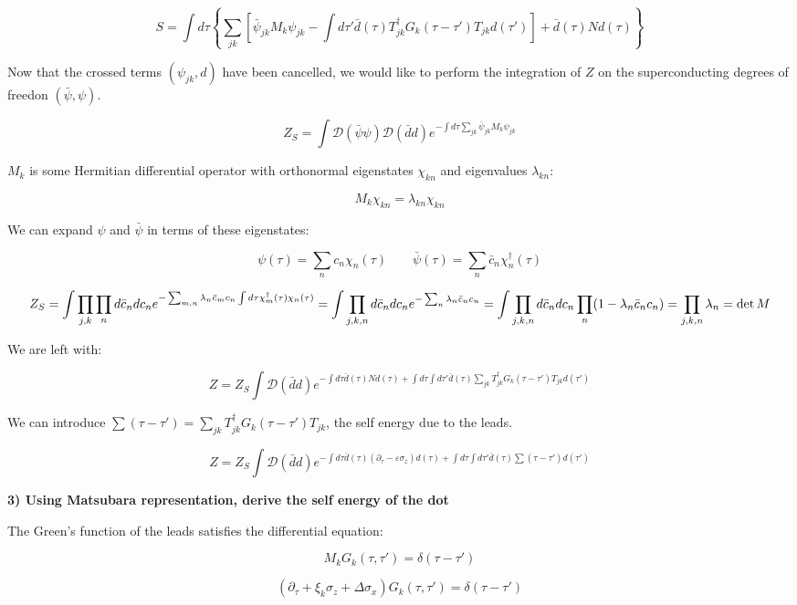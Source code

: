 \[ S = \int d\tau \left\{\sum_{jk} \left[\bar{\psi}_{jk} M_k \psi_{jk} - \int d\tau' \bar{d}(\tau) T_{jk}^\dagger G_k(\tau - \tau')T_{jk}d(\tau')  \right] + \bar{d}(\tau) N d(\tau)   \right\}\]

Now that the crossed terms \((\psi_{jk},d)\) have been cancelled, we
would like to perform the integration of \(Z\) on the superconducting
degrees of freedon \((\bar{\psi},\psi)\).

\[Z_S = \int \mathcal{D}(\bar{\psi}\psi)\mathcal{D}(\bar{d}d)e^{-\int d\tau \sum_{jk} \bar{\psi}_{jk}M_k\psi_{jk}}\]

\(M_k\) is some Hermitian differential operator with orthonormal
eigenstates \(\chi_{kn}\) and eigenvalues \(\lambda_{kn}\):

\[ M_k \chi_{kn} = \lambda_{kn}\chi_{kn}\]

We can expand \(\psi\) and \(\bar{\psi}\) in terms of these eigenstates:

\[ \psi(\tau) = \sum_n c_n \chi_{n}(\tau) \qquad \bar{\psi}(\tau) = \sum_n \bar{c}_n \chi^\dagger_n(\tau)\]

\[
Z_S = \int \prod_{j,k}\prod_n d\bar{c}_n dc_n e^{-\sum_{m,n} \lambda_n \bar{c}_m c_n \int d\tau \chi_m^\dagger(\tau)\chi_n(\tau)}
\\ = \int \prod_{j,k,n} d\bar{c}_n dc_n e^{-\sum_n \lambda_n \bar{c}_n c_n}
\\ = \int \prod_{j,k,n} d\bar{c}_n dc_n \prod_n (1 - \lambda_n \bar{c}_n c_n)
\\ = \prod_{j,k,n} \lambda_n = \det M \]

We are left with:

\[Z = Z_S \int \mathcal{D}(\bar{d}d)e^{-\int d\tau \bar{d}(\tau)N d(\tau) + \int d\tau \int d\tau' \bar{d}(\tau)\sum_{jk}T_{jk}^\dagger G_k(\tau - \tau') T_{jk} d(\tau')}\]

We can introduce
\(\sum (\tau - \tau') = \sum_{jk} T_{jk}^\dagger G_k(\tau - \tau') T_{jk}\),
the self energy due to the leads.

\[Z = Z_S \int \mathcal{D}(\bar{d}d)e^{-\int d\tau \bar{d}(\tau)(\partial_\tau - \varepsilon \sigma_z) d(\tau) + \int d\tau \int d\tau' \bar{d}(\tau)\sum(\tau - \tau') d(\tau')}\]

\textbf{3) Using Matsubara representation, derive the self energy of the
dot}

The Green's function of the leads satisfies the differential equation:

\[M_k G_k(\tau,\tau') = \delta(\tau-\tau')\]

\[(\partial_\tau + \xi_k \sigma_z + \Delta \sigma_x) G_k(\tau,\tau') = \delta(\tau - \tau')\]


